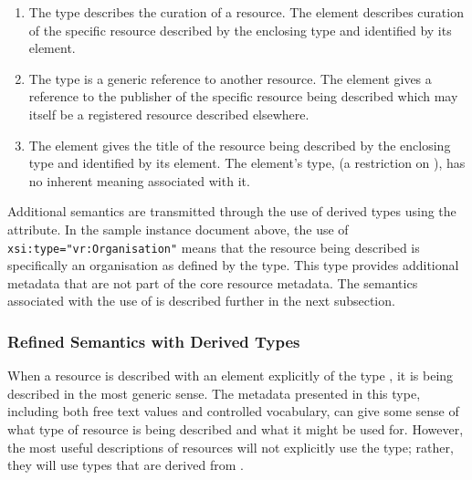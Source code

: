 \documentclass[11pt,a4paper]{ivoa}
\begin{document}
\begin{enumerate}
\item The  type describes the curation of a
       resource.  The  element
       describes curation of the specific resource described by the
       enclosing  type and identified by its
        element. 

  \item The  type is a generic reference to
       another resource.  The  element
       gives a reference to the publisher of the specific resource being
       described which may itself be a registered resource described
       elsewhere.  

  \item The  element gives the title of
       the resource being described by the enclosing
        type and identified by its
        element.  The
        element's type,
        (a restriction on
       ), has no inherent meaning associated
       with it.   
\end{enumerate}


Additional semantics are transmitted through the use of derived types
using the  attribute.  In the sample instance document
above, the use of \verb|xsi:type="vr:Organisation"| means that the
resource being described is specifically an organisation as defined by
the  type.  This type provides additional
metadata that are not part of the core resource metadata.  The semantics
associated with the use of  is described further in the
next subsection.



\subsubsection{Refined Semantics with Derived Types}
\label{sect:derivedtypes}

When a resource is described with an element explicitly of the type
, it is being described in the most generic
sense.  The metadata presented in this type, including both free text
values and controlled vocabulary, can give some sense of what
type of resource is being described and what it might be used for.
However, the most useful descriptions of resources will not explicitly
use the  type; rather, they will use types
that are derived from .  
\end{document}
